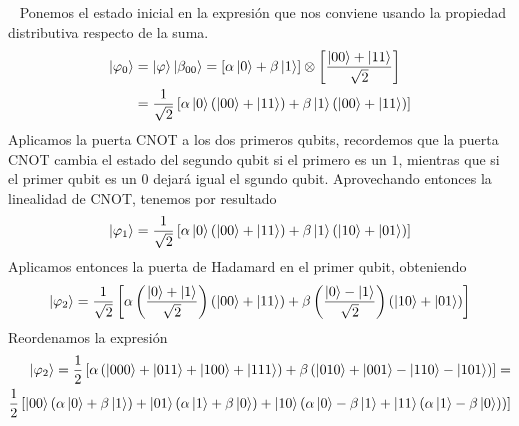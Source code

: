 \documentclass[a4paper]{article}
\numberwithin{equation}{section}
\begin{document}
\begin{figure}[h]
\centering
{}
\end{figure}\ \linebreak
Ponemos el estado inicial en la expresión que nos conviene usando la propiedad distributiva respecto de la suma.
\begin{equation}
\begin{split}
\ket{\varphi_0} & =
 \ket{\varphi}\ket{\beta_{00}} =
\left[\alpha\ket{0} + \beta\ket{1}\right] \otimes \left[ \frac{\ket{00} + \ket{11}}{\sqrt{2}} \right] \\
& =
\frac{1}{\sqrt{2}} \left[ \alpha\ket{0}(\ket{00}+\ket{11}) + \beta\ket{1}(\ket{00}+\ket{11}) \right]
\end{split}
\end{equation}
Aplicamos la puerta CNOT a los dos primeros qubits, recordemos que la puerta CNOT cambia el estado del segundo qubit si el primero es un $1$, mientras que si el primer qubit es un $0$ dejará igual el sgundo qubit. Aprovechando entonces la linealidad de CNOT, tenemos por resultado
\begin{equation}
\ket{\varphi_1} = 
\frac{1}{\sqrt{2}} \left[ \alpha\ket{0}(\ket{00}+\ket{11}) + \beta\ket{1}(\ket{10}+\ket{01}) \right]
\end{equation}
Aplicamos entonces la puerta de Hadamard en el primer qubit, obteniendo
\begin{equation}
\ket{\varphi_2} = 
\frac{1}{\sqrt{2}} \left[ \alpha \left( \frac{\ket{0}+\ket{1}}{\sqrt{2}} \right) (\ket{00}+\ket{11}) + \beta\left( \frac{\ket{0}-\ket{1}}{\sqrt{2}} \right)(\ket{10}+\ket{01}) \right]
\end{equation}
Reordenamos la expresión
\begin{equation}
\begin{split}
\ket{\varphi_2} = 
\frac{1}{2} \left[ \alpha\left(\ket{000} + \ket{011} + \ket{100} + \ket{111}\right) + \beta\left(\ket{010} + \ket{001} - \ket{110} - \ket{101}\right) \right] = 
\\
\frac{1}{2} \left[ \ket{00}(\alpha\ket{0}+\beta\ket{1}) + \ket{01}(\alpha\ket{1}+\beta\ket{0}) + \ket{10}(\alpha\ket{0}-\beta\ket{1} + \ket{11}(\alpha\ket{1}-\beta\ket{0})) \right]
\end{split}
\end{equation}
\end{document}
